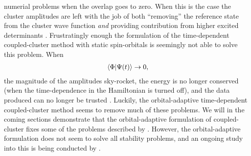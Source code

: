             numerial problems when the overlap goes to zero.
            When this is the case the cluster amplitudes are left with the job
            of both ``removing'' the reference state from the cluster wave
            function \emph{and} providing contribution from higher excited
            determinants \cite{pedersen2018symplectic}.
            Frustratingly enough the formulation of the time-dependent
            coupled-cluster method with static spin-orbitals is seemingly not
            able to solve this problem.
            When
            \begin{align}
                \braket*{\Phi}{\Psi(t)} \to 0,
            \end{align}
            the magnitude of the amplitudes sky-rocket, the energy is no longer
            conserved (when the time-dependence in the Hamiltonian is turned
            off), and the data produced can no longer be trusted
            \cite{pedersen2018symplectic}.
            Luckily, the orbital-adaptive time-dependent coupled-cluster method
            seems to remove much of these problems.
            We will in the coming sections demonstrate that the orbital-adaptive
            formulation of coupled-cluster fixes some of the problems described
            by \citeauthor{pedersen2018symplectic}
            \cite{pedersen2018symplectic}.
            However, the orbital-adaptive formulation does not seem to solve all
            stability problems, and an ongoing study into this is being
            conducted by \citeauthor{oa-stability} \cite{oa-stability}.

